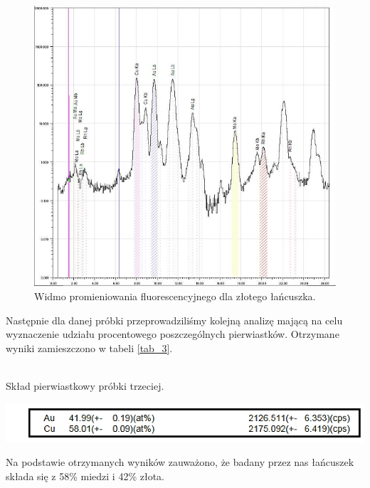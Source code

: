 \documentclass[11pt]{article}
\begin{document}
\begin{figure}[h!]
\centering %
\includegraphics[scale=0.6]{lancuszek.png}
\caption{Widmo promieniowania fluorescencyjnego dla złotego łańcuszka.}
\label{wykres_3}
\end{figure}

Następnie dla danej próbki przeprowadziliśmy kolejną analizę mającą na celu wyznaczenie udziału procentowego poszczególnych pierwiastków. Otrzymane wyniki zamieszczono w tabeli \ref{tab_3}.\\
\\	
\begin{table}[h!]
\centering
\caption{Skład pierwiastkowy próbki trzeciej.}\label{tab_3}
\includegraphics[scale=0.8]{lancuszek_il.png}\\
\end{table}

Na podstawie otrzymanych wyników zauważono, że badany przez nas łańcuszek składa się z 58\% miedzi i 42\% złota.\\

	
\end{document}
